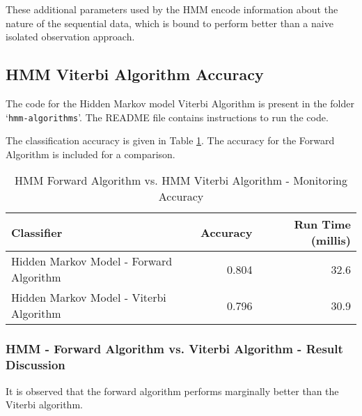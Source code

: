 \documentclass[parskip=half]{scrartcl}
\begin{document}
            These additional parameters used by the HMM encode information about the nature of the sequential data, which is bound to perform better than a naive isolated observation approach.
        



    \subsection{HMM Viterbi Algorithm Accuracy} %
    \label{sub:hmm_viterbi_algorithm_accuracy}

        The code for the Hidden Markov model Viterbi Algorithm is present in the folder `\texttt{hmm-algorithms}'. The README file contains instructions to run the code.

        The classification accuracy is given in Table \ref{tab:hmm-forward-vs-hmm-viterbi-accuracy}. The accuracy for the Forward Algorithm is included for a comparison.

        \begin{table}[ht]
            \centering
            \begin{tabular}{| l | r | r |}
            \hline
            \textbf{Classifier} & \textbf{Accuracy} & \textbf{Run Time (millis)} \\
            \hline
            \hline
                Hidden Markov Model - Forward Algorithm & 0.804 & 32.6\\
            \hline
                Hidden Markov Model - Viterbi Algorithm & 0.796 & 30.9 \\
            \hline
            \end{tabular}
            \caption{HMM Forward Algorithm vs. HMM Viterbi Algorithm - Monitoring Accuracy}
            \label{tab:hmm-forward-vs-hmm-viterbi-accuracy}
        \end{table}

        \subsubsection*{HMM - Forward Algorithm vs. Viterbi Algorithm - Result Discussion} %
        \label{ssub:hmm_forward_algo_vs_viterbi_algo_discuss}

            It is observed that the forward algorithm performs marginally better than the Viterbi algorithm.
\end{document}
